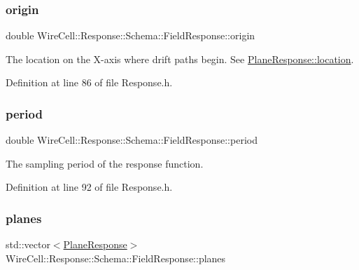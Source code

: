 \subsubsection{\texorpdfstring{origin}{origin}}
{\footnotesize\ttfamily double Wire\+Cell\+::\+Response\+::\+Schema\+::\+Field\+Response\+::origin}

The location on the X-\/axis where drift paths begin. See \hyperlink{struct_wire_cell_1_1_response_1_1_schema_1_1_plane_response_aacc9dfe4e52b217a966dba448a34cf88}{Plane\+Response\+::location}. 

Definition at line 86 of file Response.\+h.

\mbox{\label{struct_wire_cell_1_1_response_1_1_schema_1_1_field_response_aabc2db965f6cb2194dea799fe1cffa9f}} 
\subsubsection{\texorpdfstring{period}{period}}
{\footnotesize\ttfamily double Wire\+Cell\+::\+Response\+::\+Schema\+::\+Field\+Response\+::period}



The sampling period of the response function. 



Definition at line 92 of file Response.\+h.

\mbox{\label{struct_wire_cell_1_1_response_1_1_schema_1_1_field_response_a14b540e83977b1913ad00391aa719f49}} 
\subsubsection{\texorpdfstring{planes}{planes}}
{\footnotesize\ttfamily std\+::vector$<$\hyperlink{struct_wire_cell_1_1_response_1_1_schema_1_1_plane_response}{Plane\+Response}$>$ Wire\+Cell\+::\+Response\+::\+Schema\+::\+Field\+Response\+::planes}




